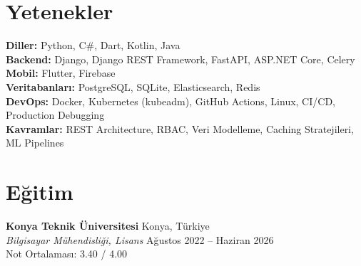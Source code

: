 \documentclass[10pt,a4paper]{extarticle}
\begin{document}
\section{Yetenekler}
\textbf{Diller:} Python, C\#, Dart, Kotlin, Java\\
\textbf{Backend:} Django, Django REST Framework, FastAPI, ASP.NET Core, Celery\\
\textbf{Mobil:} Flutter, Firebase\\
\textbf{Veritabanları:} PostgreSQL, SQLite, Elasticsearch, Redis\\
\textbf{DevOps:} Docker, Kubernetes (kubeadm), GitHub Actions, Linux, CI/CD, Production Debugging\\
\textbf{Kavramlar:} REST Architecture, RBAC, Veri Modelleme, Caching Stratejileri, ML Pipelines

\section{Eğitim}
\textbf{Konya Teknik Üniversitesi} \hfill Konya, Türkiye\\
\textit{Bilgisayar Mühendisliği, Lisans} \hfill Ağustos 2022 -- Haziran 2026\\
Not Ortalaması: 3.40 / 4.00
\end{document}
